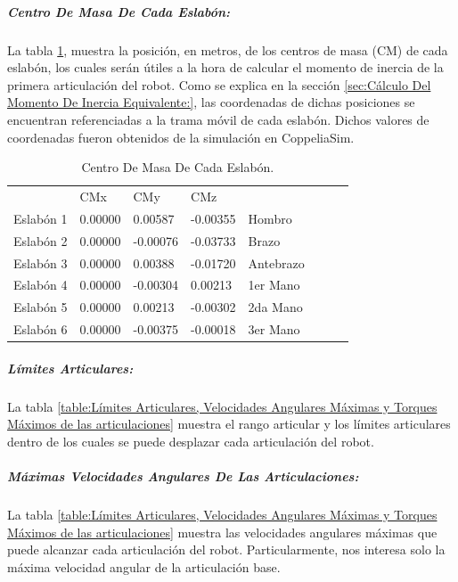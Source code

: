 \documentclass{article}
\begin{document}
\begin{sloppypar}
\subparagraph{Centro De Masa De Cada Eslabón:}
\label{sec:Centro De Masa De Cada Eslabón:}
\hfill \break
La tabla \ref{table:Centro De Masa De Cada Eslabón}, muestra la posición, en metros, de los centros de masa (CM) de cada eslabón, los cuales serán útiles a la hora de calcular el momento de inercia de la primera articulación del robot. Como se explica en la sección \ref{sec:Cálculo Del Momento De Inercia Equivalente:}, las coordenadas de dichas posiciones se encuentran referenciadas a la trama móvil de cada eslabón. Dichos valores de coordenadas fueron obtenidos de la simulación en CoppeliaSim.
\begin{table}[H]
\begin{center}
\begin{tabular}{l|lll|lll|l}
\cline{2-4}
          & CMx     & CMy      & CMz      &              \\ \cline{2-4}
Eslabón 1 & 0.00000 &  0.00587 & -0.00355 & Hombro       \\
Eslabón 2 & 0.00000 & -0.00076 & -0.03733 & Brazo        \\
Eslabón 3 & 0.00000 &  0.00388 & -0.01720 & Antebrazo    \\
Eslabón 4 & 0.00000 & -0.00304 &  0.00213 & 1er Mano  \\
Eslabón 5 & 0.00000 &  0.00213 & -0.00302 & 2da Mano \\
Eslabón 6 & 0.00000 & -0.00375 & -0.00018 & 3er Mano  \\ \cline{2-4}
\end{tabular}
\caption{\label{table:Centro De Masa De Cada Eslabón}Centro De Masa De Cada Eslabón.}
\end{center}
\end{table}


\subparagraph{Límites Articulares:}
\label{sec:Límites Articulares:}
\hfill \break
La tabla \ref{table:Límites Articulares, Velocidades Angulares Máximas y Torques Máximos de las articulaciones} muestra el rango articular y los límites articulares dentro de los cuales se puede desplazar cada articulación del robot.

\subparagraph{Máximas Velocidades Angulares De Las Articulaciones:}
\label{sec:Máximas Velocidades Angulares De Las Articulaciones:}
\hfill \break
La tabla \ref{table:Límites Articulares, Velocidades Angulares Máximas y Torques Máximos de las articulaciones} muestra las velocidades angulares máximas que puede alcanzar cada articulación del robot. Particularmente, nos interesa solo la máxima velocidad angular de la articulación base.


\end{sloppypar}
\end{document}
